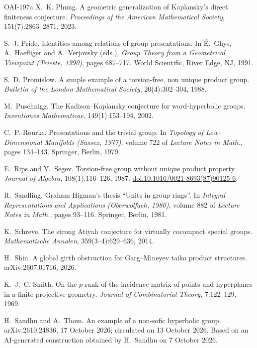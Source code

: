 \documentclass[11pt]{article}
\theoremstyle{definition}
\theoremstyle{plain}
\newcommand{\doi}[1]{\href{https://doi.org/#1}{doi:#1}}
\begin{document}
\begin{thebibliography}{OAI-197a}
X.~K. Phung.
\newblock A geometric generalization of Kaplansky's direct finiteness conjecture.
\newblock \emph{Proceedings of the American Mathematical Society}, 151(7):2863--2871, 2023.

S.~J. Pride.
\newblock Identities among relations of group presentations.
\newblock In \'E.~Ghys, A.~Haefliger and A.~Verjovsky (eds.), \emph{Group Theory from a Geometrical Viewpoint (Trieste, 1990)}, pages 687--717. World Scientific, River Edge, NJ, 1991.

S.~D. Promislow.
\newblock A simple example of a torsion-free, non unique product group.
\newblock \emph{Bulletin of the London Mathematical Society}, 20(4):302--304, 1988.

M.~Puschnigg.
\newblock The Kadison--Kaplansky conjecture for word-hyperbolic groups.
\newblock \emph{Inventiones Mathematicae}, 149(1):153--194, 2002.

C.~P. Rourke.
\newblock Presentations and the trivial group.
\newblock In \emph{Topology of Low-Dimensional Manifolds (Sussex, 1977)}, volume 722 of \emph{Lecture Notes in Math.}, pages 134--143. Springer, Berlin, 1979.

E.~Rips and Y.~Segev.
\newblock Torsion-free group without unique product property.
\newblock \emph{Journal of Algebra}, 108(1):116--126, 1987. \doi{10.1016/0021-8693(87)90125-6}.

R.~Sandling.
\newblock Graham Higman's thesis ``Units in group rings''.
\newblock In \emph{Integral Representations and Applications (Oberwolfach, 1980)}, volume 882 of \emph{Lecture Notes in Math.}, pages 93--116. Springer, Berlin, 1981.

K.~Schreve.
\newblock The strong Atiyah conjecture for virtually cocompact special groups.
\newblock \emph{Mathematische Annalen}, 359(3--4):629--636, 2014.

H.~Shin.
\newblock A global girth obstruction for Garg--Mineyev taiko product structures.
\newblock arXiv:2607.01716, 2026.

K.~J.~C. Smith.
\newblock On the $p$-rank of the incidence matrix of points and hyperplanes in a finite projective geometry.
\newblock \emph{Journal of Combinatorial Theory}, 7:122--129, 1969.

H.~Sandhu and A.~Thom.
\newblock An example of a non-sofic hyperbolic group.
\newblock arXiv:2610.24836, 17 October 2026; circulated on 13 October 2026. Based on an AI-generated construction obtained by H.~Sandhu on 7 October 2026.


\end{thebibliography}
\end{document}
